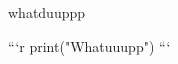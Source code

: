 \documentclass{article}
\begin{document}


whatduuppp

```{r}
print("Whatuuupp")
```
\end{document}
